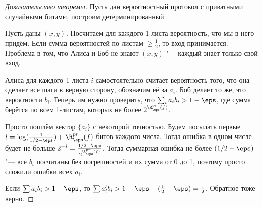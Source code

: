 \begin{proof}[Доказательство теоремы]
Пусть дан вероятностный протокол с приватными случайными битами, построим детерминированный.

Пусть даны $(x, y)$.
Посчитаем для каждого 1-листа вероятность, что мы в него придём. Если сумма вероятностей по листам $\ge \frac{1}{2}$, то вход принимается.
Проблема в том, что Алиса и Боб не знают $(x, y)$ "--- каждый знает только свой вход.

Алиса для каждого 1-листа $i$ самостоятельно считает вероятность того, что она сделает все шаги в верную сторону, обозначим её за $a_i$. Боб делает то же, это вероятности $b_i$.
Теперь им нужно проверить, что $\sum_i a_ib_i> 1 - \eps$, где сумма берётся по всем 1-листам, которых не более $2^{\R^{pr}_{\eps}(f)} $.

Просто пошлём вектор $\{a_i\}$ с некоторой точностью. Будем посылать первые $l = \log(\frac{1}{1/2 - \eps}) + \R^{pr}_{\eps}(f)$ битов каждого числа. Тогда ошибка в одном числе будет не больше $2^{-l} = \frac{1/2-\eps}{2^{\R^{pr}_{\eps}(f)}}$. Тогда суммарная ошибка не более $(1/2-\eps)$ "--- все $b_i$ посчитаны без погрешностей и их сумма от 0 до 1, поэтому просто сложили ошибки всех $a_i$.

Если $\sum a_ib_i> 1-\eps$, то $\sum a'_ib_i> 1-\eps - (\frac{1}{2} - \eps) = \frac{1}{2}$. Обратное тоже верно.
\end{proof}


